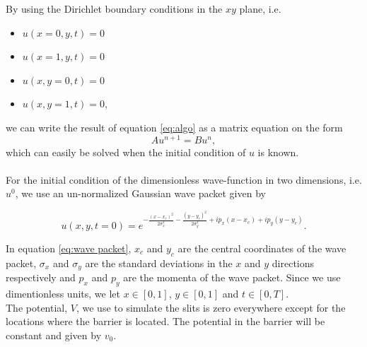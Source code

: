 \documentclass[english,notitlepage,reprint,nofootinbib]{revtex4-2}  %
\begin{document}
	\noindent
	By using the Dirichlet boundary conditions in the $xy$ plane, i.e.
	\begin{itemize}
		\item $u(x=0, y, t) = 0$
		\item $u(x=1, y, t) = 0$
		\item $u(x, y=0, t) = 0$ 
		\item $u(x, y=1, t) = 0$,
	\end{itemize}
	we can write the result of equation \ref{eq:algo} as a matrix
	equation on the form 
	\begin{equation}
	Au^{n+1} = Bu^n,	
	\end{equation} 
	which can easily be solved when the initial condition of $u$ is known.\\ \\
	\noindent
	For the initial condition of the dimensionless wave-function in two dimensions,
	i.e. $u^{0}$, we use an un-normalized Gaussian wave packet given by

	\begin{equation}\label{eq:wave packet}
		u(x,y,t=0) = e^{-\frac{(x-x_c)^2}{2 \sigma_x^2} - \frac{(y-y_c)^2}{2 \sigma_y^2} + i p_x (x-x_c) + i p_y (y-y_c)}.
	\end{equation}
	
	\noindent
	In equation \ref{eq:wave packet}, $x_c$ and $y_c$ are the central
	coordinates of the wave packet, $\sigma_x$ and $\sigma_y$ are the standard
	deviations in the $x$ and $y$ directions respectively and $p_x$ and $p_y$
	are the momenta of the wave packet. Since we use dimentionless units, we let 
	$x \in [0,1]$, $y \in [0,1]$ and $t \in [0,T]$.\\
	
	\noindent
	The potential, $V$, we use to simulate the slits is zero everywhere except 
	for the locations where the barrier is located. The potential in the
	barrier will be constant and given by $v_0$.    


	
	
\end{document}

